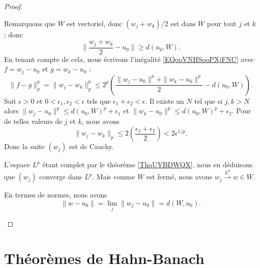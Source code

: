 \begin{proof}
\begin{subproof}
            Remarquons que \( W\) est vectoriel, donc \( (w_j+w_k)/2\) est dans \( W\) pour tout \( j\) et \( k\); donc
            \begin{equation}
                \| \frac{ w_j+w_k }{2}-u_0 \|\geq d(u_0,W).
            \end{equation}
            En tenant compte de cela, nous écrivons l'inégalité \eqref{EQooVNHSooPXjFNC} avec \( f=w_j-u_0\) et \( g=w_k-u_0\) :
            \begin{equation}
                \| f-g \|_p^p=\| w_j-w_k \|_p^p\leq 2^p\left( \frac{ \| w_j-u_0 \|^p+\| w_k-u_0 \|^p }{2}-d(u_0,W) \right).
            \end{equation}
            Soit \( \epsilon>0\) et \( 0<\epsilon_1,\epsilon_2<\epsilon\) tels que \( \epsilon_1+\epsilon_2<\epsilon\). Il existe un \( N\) tel que si \( j,k>N\) alors \( \| w_j-u_0 \|^p\leq d(u_0,W)^p+\epsilon_1\) et \( \| w_k-u_0 \|^p\leq d(u_0,W)^p+\epsilon_2\). Pour de telles valeurs de \( j\) et \( k\), nous avons
            \begin{equation}
                \| w_j-w_k \|_p\leq 2\left( \frac{ \epsilon_1+\epsilon_2 }{2} \right)<2\epsilon^{1/p}.
            \end{equation}
            Donc la suite \( (w_j)\) est de Cauchy.

            L'espace \( L^p\) étant complet par le théorème \ref{ThoUYBDWQX}, nous en déduisons que \( (w_j)\) converge dans \( L^p\). Mais comme \( W\) est fermé, nous avons \( w_j\stackrel{L^p}{\longrightarrow}w\in W\).

            En termes de normes, nous avons
            \begin{equation}
                \| w-u_0 \|=\lim_j\| w_j-u_0 \|=d(W,u_0).
            \end{equation}
    \end{subproof}
\end{proof}

\section{Théorèmes de Hahn-Banach}

